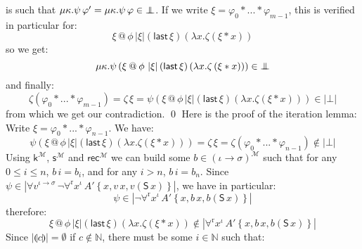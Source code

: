 \documentclass{CSML}
\makeatletter
\renewcommand{\ldots}{...}
\newcommand*\SortTo\to
\newcommand*\SortA{\sigma}
\newcommand*\LogSortedTerm[2]{#1^{#2}}
\newcommand*\LogVarA{x}
\newcommand*\LogVarE{v}
\newcommand*\LogConst[1]{\mathsf{#1}}
\newcommand*\LogBot\bot
\newcommand*\LogRel[1]{\llparenthesis#1\rrparenthesis}
\newcommand*\LogForallRel{\forall^\mathrm{r}}
\newcommand*\LogFormA{A}
\newcommand*\LogSubst[1]{\left\{#1\right\}}
\newcommand*\ModM{\mathcal{M}}
\newcommand*\ModElemB{b}
\newcommand*\ModElemC{c}
\newcommand*\ModMInterp[1]{{#1}^\ModM}
\newcommand*\LmVarA{x}
\newcommand*\LmConst[1]{\mathsf{#1}}
\newcommand*\CatRCHomA\phi
\newcommand*\CatRCHomB\psi
\newcommand*\CatRCHomC\zeta
\newcommand*\CatRCHomD\xi
\newcommand*\CatRCHomE\varphi
\newcommand*\RealVal[1]{\left|#1\right|}
\newcommand*\RealBot{{\bot\mkern-11mu\bot}}
\newcommand*\CASort\iota
\newcommand*\CALogs{\LogConst{s}}
\newcommand*\CALogk{\LogConst{k}}
\newcommand*\CALogS{\LogConst{S}}
\newcommand*\CALogrec{\LogConst{rec}}
\newcommand*\CALmconcat{\mathbin{@}}
\newcommand*\CALmextend{\mathbin{*}}
\newcommand*\CALmlen[1]{\left|#1\right|}
\makeatother
\begin{document}
is such that $\mu\kappa.\CatRCHomB\,\CatRCHomE'=\mu\kappa.\CatRCHomB\,\CatRCHomE\in\RealBot$. If we write $\CatRCHomD=\CatRCHomE_0\CALmextend\ldots\CALmextend\CatRCHomE_{m-1}$, this is verified in particular for:
$$\CatRCHomD\CALmconcat\CatRCHomA\,\CALmlen{\CatRCHomD}\left(\LmConst{last}\,\CatRCHomD\right)\left(\lambda\LmVarA.\CatRCHomC\left(\CatRCHomD\CALmextend\LmVarA\right)\right)$$
so we get:
$$\mu\kappa.\CatRCHomB\left(\CatRCHomD\CALmconcat\CatRCHomA\,\CALmlen{\CatRCHomD}\left(\LmConst{last}\,\CatRCHomD\right)\left(\lambda\LmVarA.\CatRCHomC\left(\CatRCHomD\CALmextend\LmVarA\right)\right)\right)\in\RealBot$$
and finally:
$$\CatRCHomC\left(\CatRCHomE_0\CALmextend\ldots\CALmextend\CatRCHomE_{m-1}\right)=\CatRCHomC\,\CatRCHomD=\CatRCHomB\left(\CatRCHomD\CALmconcat\CatRCHomA\,\CALmlen{\CatRCHomD}\left(\LmConst{last}\,\CatRCHomD\right)\left(\lambda\LmVarA.\CatRCHomC\left(\CatRCHomD\CALmextend\LmVarA\right)\right)\right)\in\RealVal{\LogBot}$$
from which we get our contradiction.
\qed
Here is the proof of the iteration lemma:
\proof
Write $\CatRCHomD=\CatRCHomE_0\CALmextend\ldots\CALmextend\CatRCHomE_{n-1}$. We have:
$$\CatRCHomB\left(\CatRCHomD\CALmconcat\CatRCHomA\,\CALmlen{\CatRCHomD}\left(\LmConst{last}\,\CatRCHomD\right)\left(\lambda\LmVarA.\CatRCHomC\left(\CatRCHomD\CALmextend\LmVarA\right)\right)\right)=\CatRCHomC\,\CatRCHomD=\CatRCHomC\left(\CatRCHomE_0\CALmextend\ldots\CALmextend\CatRCHomE_{n-1}\right)\notin\RealVal{\LogBot}$$
Using $\ModMInterp{\CALogk}$, $\ModMInterp{\CALogs}$ and $\ModMInterp{\CALogrec}$ we can build some $\ModElemB\in\ModMInterp{\left(\CASort\SortTo\SortA\right)}$ such that for any $0\leq i\leq n$, $\ModElemB\,i=\ModElemB_i$, and for any $i>n$, $\ModElemB\,i=\ModElemB_n$. Since $\CatRCHomB\in\RealVal{\forall\LogSortedTerm{\LogVarE}{\CASort\SortTo\SortA}\,\neg\LogForallRel\LogSortedTerm{\LogVarA}{\CASort}\,\LogFormA'\LogSubst{\LogVarA,\LogVarE\,\LogVarA,\LogVarE\left(\CALogS\,\LogVarA\right)}}$, we have in particular:
$$\CatRCHomB\in\RealVal{\neg\LogForallRel\LogSortedTerm{\LogVarA}{\CASort}\,\LogFormA'\LogSubst{\LogVarA,\ModElemB\,\LogVarA,\ModElemB\left(\CALogS\,\LogVarA\right)}}$$
therefore:
$$\CatRCHomD\CALmconcat\CatRCHomA\,\CALmlen{\CatRCHomD}\left(\LmConst{last}\,\CatRCHomD\right)\left(\lambda\LmVarA.\CatRCHomC\left(\CatRCHomD\CALmextend\LmVarA\right)\right)\notin\RealVal{\LogForallRel\LogSortedTerm{\LogVarA}{\CASort}\,\LogFormA'\LogSubst{\LogVarA,\ModElemB\,\LogVarA,\ModElemB\left(\CALogS\,\LogVarA\right)}}$$
Since $\RealVal{\LogRel{\ModElemC}}=\emptyset$ if $\ModElemC\notin\mathbb{N}$, there must be some $i\in\mathbb{N}$ such that:
\end{document}
